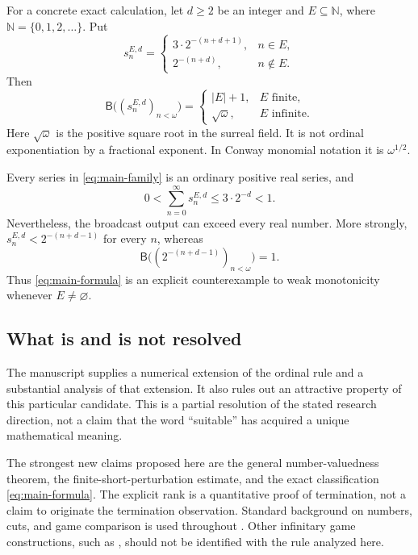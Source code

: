 \documentclass[11pt,letterpaper]{article}
\theoremstyle{definition}
\theoremstyle{remark}
\newcommand{\NN}{\mathbb N}
\newcommand{\BB}{\mathsf B}
\begin{document}
For a concrete exact calculation, let $d\geq2$ be an integer and $E\subseteq\NN$,
where $\NN=\{0,1,2,\ldots\}$. Put
\begin{equation}\label{eq:main-family}
 s_n^{E,d}=\begin{cases}
 3\cdot2^{-(n+d+1)},&n\in E,\\
 2^{-(n+d)},&n\notin E.
 \end{cases}
\end{equation}
Then
\begin{equation}\label{eq:main-formula}
 \boxed{\quad
 \BB\bigl((s_n^{E,d})_{n<\omega}\bigr)=
 \begin{cases}
 |E|+1,&E\text{ finite},\\[2pt]
 \sqrt{\omega},&E\text{ infinite}.
 \end{cases}\quad}
\end{equation}
Here $\sqrt{\omega}$ is the positive square root in the surreal field. It is not
ordinal exponentiation by a fractional exponent. In Conway monomial notation
it is $\omega^{1/2}$.

Every series in \eqref{eq:main-family} is an ordinary positive real series, and
\begin{equation}\label{eq:classical-bound}
 0<\sum_{n=0}^{\infty}s_n^{E,d}\leq3\cdot2^{-d}<1.
\end{equation}
Nevertheless, the broadcast output can exceed every real number. More strongly,
$s_n^{E,d}<2^{-(n+d-1)}$ for every $n$, whereas
\begin{equation}\label{eq:larger-sequence}
 \BB\bigl((2^{-(n+d-1)})_{n<\omega}\bigr)=1.
\end{equation}
Thus \eqref{eq:main-formula} is an explicit counterexample to weak monotonicity
whenever $E\neq\varnothing$.

\subsection{What is and is not resolved}

The manuscript supplies a numerical extension of the ordinal rule and a
substantial analysis of that extension. It also rules out an attractive property
of this particular candidate. This is a partial resolution of the stated
research direction, not a claim that the word ``suitable'' has acquired a unique
mathematical meaning.

The strongest new claims proposed here are the general number-valuedness theorem,
the finite-short-perturbation estimate, and the exact classification
\eqref{eq:main-formula}. The explicit rank is a quantitative proof of termination,
not a claim to originate the termination observation. Standard background on
numbers, cuts, and game comparison is used throughout
\cite{conway,gonshor,schleicherstoll}. Other infinitary game constructions, such
as \cite{lipparini2024,lipparini2025}, should not be identified with the rule
analyzed here.
\end{document}

